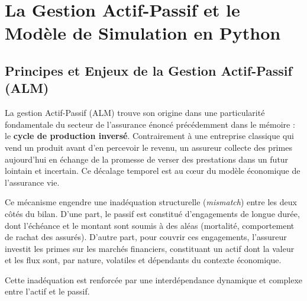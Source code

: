 \chapter{La Gestion Actif-Passif et le Modèle de Simulation en Python}

\section{Principes et Enjeux de la Gestion Actif-Passif (ALM)}
La gestion Actif-Passif (ALM) trouve son origine dans une particularité fondamentale du secteur de l'assurance énoncé précédemment dans le mémoire : le \textbf{cycle de production inversé}. Contrairement à une entreprise classique qui vend un produit avant d'en percevoir le revenu, un assureur collecte des primes aujourd'hui en échange de la promesse de verser des prestations dans un futur lointain et incertain. Ce décalage temporel est au cœur du modèle économique de l'assurance vie.

Ce mécanisme engendre une inadéquation structurelle (\textit{mismatch}) entre les deux côtés du bilan. D'une part, le passif est constitué d'engagements de longue durée, dont l'échéance et le montant sont soumis à des aléas (mortalité, comportement de rachat des assurés). D'autre part, pour couvrir ces engagements, l'assureur investit les primes sur les marchés financiers, constituant un actif dont la valeur et les flux sont, par nature, volatiles et dépendants du contexte économique.

Cette inadéquation est renforcée par une interdépendance dynamique et complexe entre l'actif et le passif.

